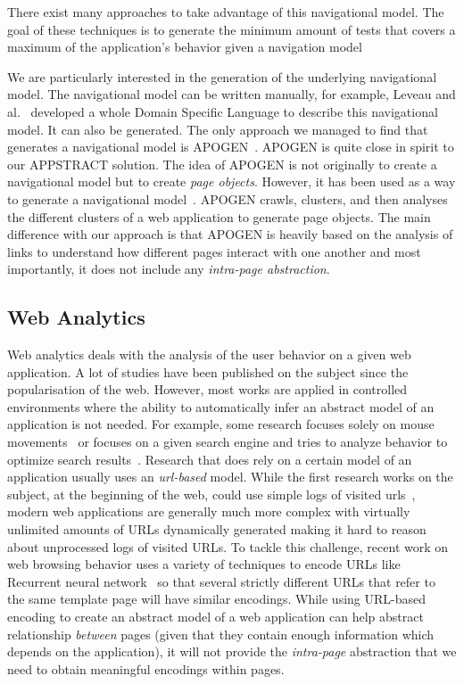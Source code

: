 There exist many approaches to take advantage of this navigational model. The goal of these techniques is to generate the minimum amount of tests that covers a maximum of the application's behavior given a navigation model~\cite{leveau2022fostering, mesbah2009invariant, yuan2007using, biagiola2019diversity}

We are particularly interested in the generation of the underlying navigational model.
The navigational model can be written manually, for example, Leveau and al.~\cite{leveau2022fostering} developed a whole Domain Specific Language to describe this navigational model. 
It can also be generated. The only approach we managed to find that generates a navigational model is APOGEN~\cite{stocco2017apogen}. APOGEN is quite close in spirit to our APPSTRACT solution. The idea of APOGEN is not originally to create a navigational model but to create \textit{page objects}. However, it has been used as a way to generate a navigational model~\cite{biagiola2019diversity}. APOGEN crawls, clusters, and then analyses the different clusters of a web application to generate page objects. The main difference with our approach is that APOGEN is heavily based on the analysis of links to understand how different pages interact with one another and most importantly, it does not include any \textit{intra-page abstraction}.

\subsection{Web Analytics}
Web analytics deals with the analysis of the user behavior on a given web application.
A lot of studies have been published on the subject since the popularisation of the web. However, most works are applied in controlled environments where the ability to automatically infer an abstract model of an application is not needed. For example, some research focuses solely on mouse movements~\cite{guo2008exploring, yamauchi2013mouse} or focuses on a given search engine and tries to analyze behavior to optimize search results~\cite{agichtein2006learning, agichtein2006improving}.
Research that does rely on a certain model of an application usually uses an \textit{url-based} model. While the first research works on the subject, at the beginning of the web, could use simple logs of visited urls~\cite{gunduz2003web, mobasher2001effective, sarukkai2000link}, modern web applications are generally much more complex with virtually unlimited amounts of URLs dynamically generated making it hard to reason about unprocessed logs of visited URLs.
To tackle this challenge, recent work on web browsing behavior uses a variety of techniques to encode URLs like Recurrent neural network~\cite{Ou2021ModelingSide} so that several strictly different URLs that refer to the same template page will have similar encodings. While using URL-based encoding to create an abstract model of a web application can help abstract relationship \textit{between} pages (given that they contain enough information which depends on the application), it will not provide the \textit{intra-page} abstraction that we need to obtain meaningful encodings within pages.

